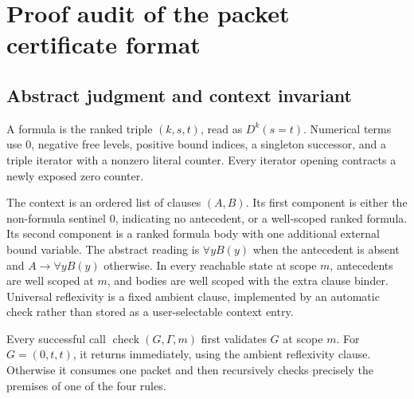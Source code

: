 \section{Proof audit of the packet certificate format}

\subsection{Abstract judgment and context invariant}
A formula is the ranked triple \((k,s,t)\), read as \(D^k(s=t)\).
Numerical terms use \(0\), negative free levels, positive bound indices,
a singleton successor, and a triple iterator with a nonzero literal
counter. Every iterator opening contracts a newly exposed zero counter.

The context is an ordered list of clauses \((A,B)\). Its first component
is either the non-formula sentinel \(0\), indicating no antecedent, or a
well-scoped ranked formula. Its second component is a ranked formula
body with one additional external bound variable. The abstract reading
is \(\forall y B(y)\) when the antecedent is absent and
\(A\to\forall yB(y)\) otherwise.
In every reachable state at scope \(m\), antecedents are well scoped at
\(m\), and bodies are well scoped with the extra clause binder.
Universal reflexivity is a fixed ambient clause, implemented by an
automatic check rather than stored as a user-selectable context entry.

Every successful call \(\operatorname{check}(G,\Gamma,m)\) first validates
\(G\) at scope \(m\). For \(G=(0,t,t)\), it returns immediately, using the
ambient reflexivity clause. Otherwise it consumes one packet and then
recursively checks precisely the premises of one of the four rules.

